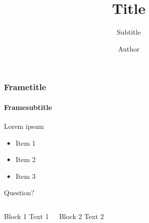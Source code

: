\documentclass{beamer}
\title{Title}
\subtitle{Subtitle}
\author{Author}
\institute[]{Institute}
\begin{document}
\begin{frame}
\titlepage
\end{frame}

\begin{frame}
\frametitle{Frametitle}
\framesubtitle{Framesubtitle}
Lorem ipsum
\begin{itemize}
	\item Item 1
	\item Item 2
	\item Item 3
\end{itemize}
\vfill
Question?
\begin{columns}[t]
\begin{block}{Block 1}
Text 1
\end{block}
\begin{block}{Block 2}
Text 2
\end{block}
\end{columns}
\end{frame}
\end{document}
